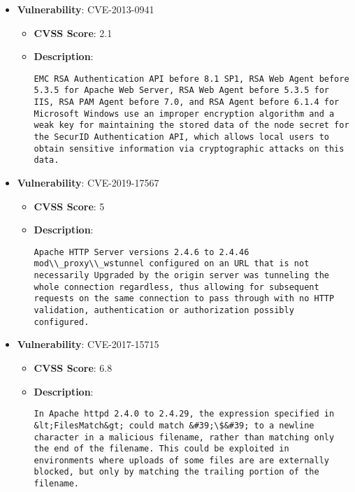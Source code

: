 \documentclass{article}
\begin{document}
\begin{itemize}
        \item \textbf{Vulnerability}: CVE-2013-0941
        \begin{itemize}
            \item \textbf{CVSS Score}:  2.1 
            \item \textbf{Description}:
            \parbox[t]{0.9\linewidth}{
                \verb|EMC RSA Authentication API before 8.1 SP1, RSA Web Agent before 5.3.5 for Apache Web Server, RSA Web Agent before 5.3.5 for IIS, RSA PAM Agent before 7.0, and RSA Agent before 6.1.4 for Microsoft Windows use an improper encryption algorithm and a weak key for maintaining the stored data of the node secret for the SecurID Authentication API, which allows local users to obtain sensitive information via cryptographic attacks on this data.|
            }
        \end{itemize}
    
        \item \textbf{Vulnerability}: CVE-2019-17567
        \begin{itemize}
            \item \textbf{CVSS Score}:  5 
            \item \textbf{Description}:
            \parbox[t]{0.9\linewidth}{
                \verb|Apache HTTP Server versions 2.4.6 to 2.4.46 mod\\_proxy\\_wstunnel configured on an URL that is not necessarily Upgraded by the origin server was tunneling the whole connection regardless, thus allowing for subsequent requests on the same connection to pass through with no HTTP validation, authentication or authorization possibly configured.|
            }
        \end{itemize}
    
        \item \textbf{Vulnerability}: CVE-2017-15715
        \begin{itemize}
            \item \textbf{CVSS Score}:  6.8 
            \item \textbf{Description}:
            \parbox[t]{0.9\linewidth}{
                \verb|In Apache httpd 2.4.0 to 2.4.29, the expression specified in &lt;FilesMatch&gt; could match &#39;\$&#39; to a newline character in a malicious filename, rather than matching only the end of the filename. This could be exploited in environments where uploads of some files are are externally blocked, but only by matching the trailing portion of the filename.|
            }
        \end{itemize}
    

\end{itemize}
\end{document}
